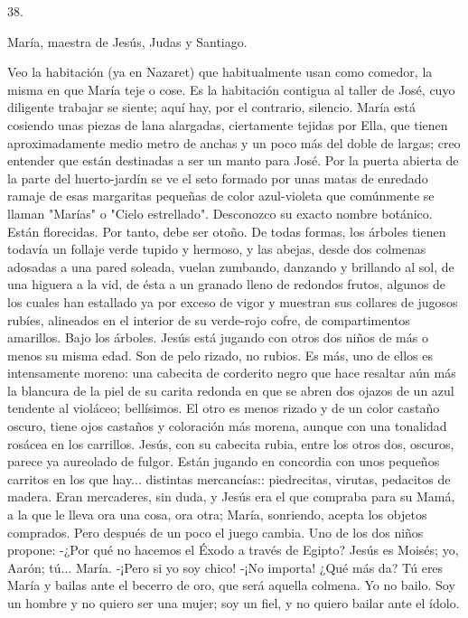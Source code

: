 \documentclass[12pt]{book} %
\begin{document}
38. 
 
María, maestra de Jesús, Judas y Santiago. 
 
 Veo la habitación (ya en Nazaret) que habitualmente usan como comedor, la misma en que María teje o cose. Es la 
habitación contigua al taller de José, cuyo diligente trabajar se siente; aquí hay, por el contrario, silencio. María está cosiendo unas piezas de lana alargadas, ciertamente tejidas por Ella, que tienen aproximadamente medio metro de anchas y un poco más del doble de largas; creo entender que están destinadas a ser un manto para José. 
Por la puerta abierta de la parte del huerto-jardín se ve el seto formado por unas matas de enredado ramaje de esas 
margaritas pequeñas de color azul-violeta que comúnmente se llaman "Marías" o "Cielo estrellado". Desconozco su exacto nombre botánico. Están florecidas. Por tanto, debe ser otoño. De todas formas, los árboles tienen todavía un follaje verde tupido y hermoso, y las abejas, desde dos colmenas adosadas a una pared soleada, vuelan zumbando, danzando y brillando al sol, de una higuera a la vid, de ésta a un granado lleno de redondos frutos, algunos de los cuales han estallado ya por exceso de vigor y muestran sus collares de jugosos rubíes, alineados en el interior de su verde-rojo cofre, de compartimentos amarillos. 
Bajo los árboles. Jesús está jugando con otros dos niños de más o menos su misma edad. Son de pelo rizado, no rubios. Es más, uno de ellos es intensamente moreno: una cabecita de corderito negro que hace resaltar aún más la blancura de la piel de su carita redonda en que se abren dos ojazos de un azul tendente al violáceo; bellísimos. El otro es menos rizado y de un color castaño oscuro, tiene ojos castaños y coloración más morena, aunque con una tonalidad rosácea en los carrillos. Jesús, con su cabecita rubia, entre los otros dos, oscuros, parece ya aureolado de fulgor. Están jugando en concordia con unos pequeños carritos en los que hay... distintas mercancías:: piedrecitas, virutas, pedacitos de madera. Eran mercaderes, sin duda, y Jesús era el que compraba para su Mamá, a la que le lleva ora una cosa, ora otra; María, sonriendo, acepta los objetos comprados. 
Pero después de un poco el juego cambia. Uno de los dos niños propone: 
-¿Por qué no hacemos el Éxodo a través de Egipto? Jesús es Moisés; yo, Aarón; tú... María. 
-¡Pero si yo soy chico! 
-¡No importa! ¿Qué más da? Tú eres María y bailas ante el becerro de oro, que será aquella colmena.             
Yo no bailo. Soy un hombre y no quiero ser una mujer; soy un fiel, y no quiero bailar ante el ídolo. 
\end{document}

